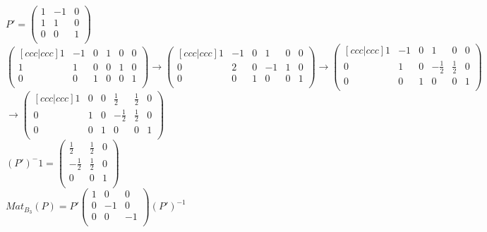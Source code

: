 \documentclass{article}
\begin{document}
$P' = \begin{pmatrix}
    1 & -1 & 0\\
    1 & 1 & 0\\
    0 & 0 & 1\\
\end{pmatrix}$\\
$\begin{pmatrix}[ccc|ccc]
    1 & -1 & 0 & 1 & 0 & 0\\
    1 & 1 & 0 & 0 & 1 & 0\\
    0 & 0 & 1 & 0 & 0 & 1\\
\end{pmatrix} \rightarrow \begin{pmatrix}[ccc|ccc]
    1 & -1 & 0 & 1 & 0 & 0\\
    0 & 2 & 0 & -1 & 1 & 0\\
    0 & 0 & 1 & 0 & 0 & 1\\
\end{pmatrix} \rightarrow \begin{pmatrix}[ccc|ccc]
    1 & -1 & 0 & 1 & 0 & 0\\
    0 & 1 & 0 & -\frac{1}{2} & \frac{1}{2} & 0\\
    0 & 0 & 1 & 0 & 0 & 1\\
\end{pmatrix}$\vspace{3mm}\\
$ \rightarrow \begin{pmatrix}[ccc|ccc]
    1 & 0 & 0 & \frac{1}{2} & \frac{1}{2} & 0\\
    0 & 1 & 0 & -\frac{1}{2} & \frac{1}{2} & 0\\
    0 & 0 & 1 & 0 & 0 & 1\\
\end{pmatrix}$\\
$(P')^-1 = \begin{pmatrix}
    \frac{1}{2} & \frac{1}{2} & 0\\
    -\frac{1}{2} & \frac{1}{2} & 0\\
    0 & 0 & 1\\
\end{pmatrix}$\\
$Mat_{B_3}(P) = P'\begin{pmatrix}
    1 & 0 & 0\\
    0 & -1 & 0\\
    0 & 0 & -1\\
\end{pmatrix}(P')^{-1}$ \vspace{3mm}\\
\end{document}

